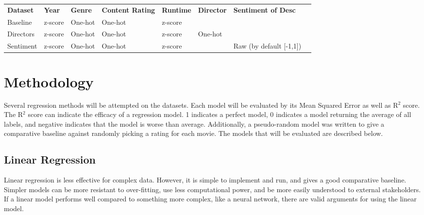 \documentclass[11pt,letterpaper,oneside,titlepage]{article}
\begin{document}
\begin{center}
\begin{tabular}{|l|l|l|l|l|l|l|l}
\cline{1-7}
          \textbf{Dataset} & \textbf{Year}    & \textbf{Genre}   & \textbf{Content Rating} & \textbf{Runtime} & \textbf{Director} & \textbf{Sentiment of Desc}    &  \\ \cline{1-7}
Baseline  & z-score & One-hot & One-hot        & z-score &          &                             &  \\ \cline{1-7}
Directors & z-score & One-hot & One-hot        & z-score & One-hot  &                             &  \\ \cline{1-7}
Sentiment & z-score & One-hot & One-hot        & z-score &          & Raw (by default {[}-1,1{]}) &  \\ \cline{1-7}
\end{tabular}
    \captionsetup{justification=centering}
\end{center}

\section{Methodology}

Several regression methods will be attempted on the datasets. Each model will be evaluated by its Mean Squared Error as well as R$^2$ score. The R$^2$ score can indicate the efficacy of a regression model. 1 indicates a perfect model, 0 indicates a model returning the average of all labels, and negative indicates that the model is worse than average\cite{sklearn_r2}\cite{Wall_2022}. Additionally, a pseudo-random model was written to give a comparative baseline against randomly picking a rating for each movie. The models that will be evaluated are described below.

\subsection{Linear Regression}

Linear regression is less effective for complex data. However, it is simple to implement and run, and gives a good comparative baseline. Simpler models can be more resistant to over-fitting, use less computational power, and be more easily understood to external stakeholders. If a linear model performs well compared to something more complex, like a neural network, there are valid arguments for using the linear model.
\end{document}
